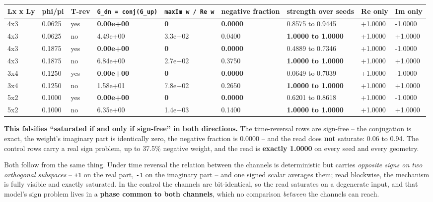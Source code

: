 \documentclass[10pt,letterpaper,twocolumn]{article}
\begin{document}
\begin{table}[tp]
\centering\footnotesize
\begin{tabular}{L{0.058\textwidth}L{0.050\textwidth}L{0.042\textwidth}L{0.154\textwidth}L{0.145\textwidth}L{0.142\textwidth}L{0.143\textwidth}L{0.058\textwidth}L{0.058\textwidth}}
\toprule
Lx x Ly & phi/pi & T-rev & \texttt{G\_\allowbreak{}dn\ =\allowbreak{}\ conj(\allowbreak{}G\_\allowbreak{}up)\allowbreak{}} & \texttt{max\textbar{}\allowbreak{}Im\ w\ /\allowbreak{}\ Re\ w\textbar{}\allowbreak{}} & negative fraction & strength over seeds & Re only & Im only \\
\midrule
4x3 & 0.0625 & yes & \textbf{0.00e+00} & \textbf{0} & \textbf{0.0000} & 0.8575 to 0.9445 & +1.0000 & -1.0000 \\
4x3 & 0.0625 & no & 4.49e+00 & 3.3e+02 & 0.0400 & \textbf{1.0000 to 1.0000} & +1.0000 & +1.0000 \\
4x3 & 0.1875 & yes & \textbf{0.00e+00} & \textbf{0} & \textbf{0.0000} & 0.4889 to 0.7346 & +1.0000 & -1.0000 \\
4x3 & 0.1875 & no & 6.84e+00 & 2.7e+02 & 0.3750 & \textbf{1.0000 to 1.0000} & +1.0000 & +1.0000 \\
3x4 & 0.1250 & yes & \textbf{0.00e+00} & \textbf{0} & \textbf{0.0000} & 0.0649 to 0.7039 & +1.0000 & -1.0000 \\
3x4 & 0.1250 & no & 1.58e+01 & 7.8e+02 & 0.2650 & \textbf{1.0000 to 1.0000} & +1.0000 & +1.0000 \\
5x2 & 0.1000 & yes & \textbf{0.00e+00} & \textbf{0} & \textbf{0.0000} & 0.6201 to 0.8618 & +1.0000 & -1.0000 \\
5x2 & 0.1000 & no & 6.35e+00 & 1.4e+03 & 0.1400 & \textbf{1.0000 to 1.0000} & +1.0000 & +1.0000 \\
\bottomrule
\end{tabular}
\end{table}

\textbf{This falsifies ``saturated if and only if sign-free'' in both directions.} The time-reversal rows
are sign-free -- the conjugation is exact, the weight's imaginary part is identically zero, the
negative fraction is 0.0000 -- and the read does \textbf{not} saturate: 0.06 to 0.94. The control rows
carry a real sign problem, up to 37.5\% negative weight, and the read is \textbf{exactly 1.0000} on every
seed and every geometry.

Both follow from the same thing. Under time reversal the relation between the channels is
deterministic but carries \emph{opposite signs on two orthogonal subspaces} -- \texttt{+\allowbreak{}1} on the real part,
\texttt{-{}\allowbreak{}1} on the imaginary part -- and one signed scalar averages them; read blockwise, the mechanism is
fully visible and exactly saturated. In the control the channels are bit-identical, so the read
saturates on a degenerate input, and that model's sign problem lives in a \textbf{phase common to both
channels}, which no comparison \emph{between} the channels can reach.
\end{document}

